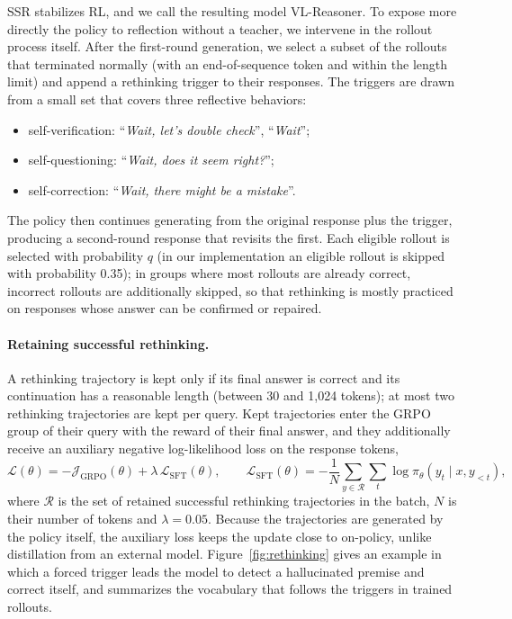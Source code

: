 \documentclass{article}
\begin{document}
SSR stabilizes RL, and we call the resulting model VL-Reasoner. To expose more directly the policy to reflection without a teacher, we intervene in the rollout process itself. After the first-round generation, we select a subset of the rollouts that terminated normally (with an end-of-sequence token and within the length limit) and append a rethinking trigger to their responses. The triggers are drawn from a small set that covers three reflective behaviors:
\begin{itemize}[leftmargin=*,itemsep=0pt,topsep=2pt]
\item self-verification: ``\emph{Wait, let's double check}'', ``\emph{Wait}'';
\item self-questioning: ``\emph{Wait, does it seem right?}'';
\item self-correction: ``\emph{Wait, there might be a mistake}''.
\end{itemize}
The policy then continues generating from the original response plus the trigger, producing a second-round response that revisits the first. Each eligible rollout is selected with probability $q$ (in our implementation an eligible rollout is skipped with probability 0.35); in groups where most rollouts are already correct, incorrect rollouts are additionally skipped, so that rethinking is mostly practiced on responses whose answer can be confirmed or repaired.

\paragraph{Retaining successful rethinking.} A rethinking trajectory is kept only if its final answer is correct and its continuation has a reasonable length (between 30 and 1{,}024 tokens); at most two rethinking trajectories are kept per query. Kept trajectories enter the GRPO group of their query with the reward of their final answer, and they additionally receive an auxiliary negative log-likelihood loss on the response tokens,
\begin{equation}
\mathcal{L}(\theta)=-\mathcal{J}_\text{GRPO}(\theta)+\lambda\,\mathcal{L}_\text{SFT}(\theta),\qquad \mathcal{L}_\text{SFT}(\theta)=-\frac{1}{N}\sum_{y\in\mathcal{R}}\sum_{t}\log\pi_\theta(y_t\mid x,y_{<t}),
\label{eq:loss}
\end{equation}
where $\mathcal{R}$ is the set of retained successful rethinking trajectories in the batch, $N$ is their number of tokens and $\lambda=0.05$. Because the trajectories are generated by the policy itself, the auxiliary loss keeps the update close to on-policy, unlike distillation from an external model. Figure~\ref{fig:rethinking} gives an example in which a forced trigger leads the model to detect a hallucinated premise and correct itself, and summarizes the vocabulary that follows the triggers in trained rollouts.
\end{document}
